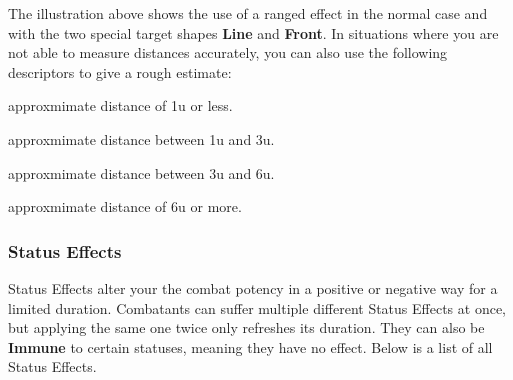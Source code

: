 %
\noindent
The illustration above shows the use of a ranged effect in the normal case and with the two
special target shapes \textbf{Line} and \textbf{Front}.
In situations where you are not able to measure distances accurately, you can also use the following descriptors to give a rough estimate:
%
\pagebreak
%
\begin{description}[leftmargin=*]
	\item[\accf{Adjacent}:] approxmimate distance of 1u or less.
	\item[\accf{Close}:] approxmimate distance between 1u and 3u.
	\item[\accf{Near}:] approxmimate distance between 3u and 6u.
	\item[\accf{Far}:] approxmimate distance of 6u or more.
\end{description}
%
\vfill
\subsubsection*{\hypertarget{status}{Status Effects}}
Status Effects alter your the combat potency in a positive or negative way for a limited duration.
Combatants can suffer multiple different Status Effects at once, but applying the same one twice only refreshes its duration. 
They can also be \textbf{Immune} to certain statuses, meaning they have no effect. 
Below is a list of all Status Effects.
